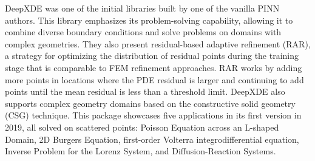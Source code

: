 \documentclass[pdflatex,sn-basic]{sn-jnl}%
\theoremstyle{thmstyleone}%
\theoremstyle{thmstyletwo}%
\theoremstyle{thmstylethree}%
\begin{document}
DeepXDE \citep{lu2021deepxde} was one of the initial libraries built by one of the vanilla PINN authors. 
This library emphasizes its problem-solving capability, allowing it to combine diverse boundary conditions and solve problems on domains with complex geometries. 
They also present residual-based adaptive refinement (RAR), a strategy for optimizing the distribution of residual points during the training stage that is comparable to FEM refinement approaches. RAR works by adding more points in locations where the PDE residual is larger and continuing to add points until the mean residual is less than a threshold limit. 
DeepXDE also supports complex geometry domains based on the constructive solid geometry  (CSG) technique.
%
This package showcases five applications in its first version in 2019, all solved on scattered points: Poisson Equation across an L-shaped Domain, 2D Burgers Equation, first-order Volterra integrodifferential equation, Inverse Problem for the Lorenz System, and Diffusion-Reaction Systems.
\end{document}
